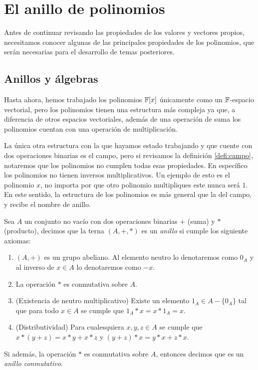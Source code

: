 \section{El anillo de polinomios}

Antes de continuar revisando las propiedades de los valores y vectores propios, necesitamos conocer algunas de las principales propiedades de los polinomios, que serán necesarias para el desarrollo de temas posteriores.

\subsection{Anillos y álgebras}

Hasta ahora, hemos trabajado los polinomios $\mathbb{F}[x]$ únicamente como un $\mathbb{F}$-espacio vectorial, pero los polinomios tienen una estructura más compleja ya que, a diferencia de otros espacios vectoriales, además de una operación de suma los polinomios cuentan con una operación de multiplicación.

La única otra estructura con la que hayamos estado trabajando y que cuente con dos operaciones binarias es el campo, pero si revisamos la definición \ref{defi:campo}, notaremos que los polinomios no cumplen todas esas propiedades. En específico los polinomios no tienen inversos multiplicativos. Un ejemplo de esto es el polinomio $x$, no importa por que otro polinomio multipliques este nunca será $1$. En este sentido, la estructura de los polinomios es más general que la del campo, y recibe el nombre de anillo.

\begin{defi}
  Sea $A$ un conjunto no vacío con dos operaciones binarias $+$ (suma) y $*$ (producto), decimos que la terna $(A,+,*)$ es un \emph{anillo} si cumple los siguiente axiomas:
  \begin{enumerate}
    \item $(A,+)$ es un grupo abeliano. Al elemento neutro lo denotaremos como $0_A$ y al inverso de $x \in A$ lo denotaremos como $-x$.
    \item La operación $*$ es conmutativa sobre $A$.
    \item (Existencia de neutro multiplicativo) Existe un elemento $1_A \in A-\{0_A\}$ tal que para todo $x \in A$ se cumple que $1_A * x = x * 1_A = x$.
    \item (Distributividad) Para cualesquiera $x, y, z \in A$ se cumple que $x * (y + z) = x * y + x * z$ y $(y + z) * x =   y * x + z * x$.
  \end{enumerate}
  Si además, la operación $*$ es conmutativa sobre $A$, entonces decimos que es un \emph{anillo conmutativo}.
\end{defi}

